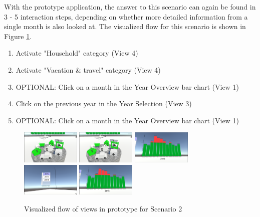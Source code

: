 With the prototype application, the answer to this scenario can again be found in 3 - 5 interaction steps, depending on whether more detailed information from a single month is also looked at. The visualized flow for this scenario is shown in Figure \ref{fig:scenariotwoprototype}.
\begin{enumerate}
	\item Activate "Household" category (View 4)
	\item Activate "Vacation \& travel" category (View 4)
	\item OPTIONAL: Click on a month in the Year Overview bar chart (View 1)
	\item Click on the previous year in the Year Selection (View 3)
	\item OPTIONAL: Click on a month in the Year Overview bar chart (View 1)
\end{enumerate}
\begin{figure}[h]
	\begin{center}
		\includegraphics[width=2.8cm]{03_Figures/08_Development/View4_CategoriesFiltering.png}
		\includegraphics[width=2.8cm]{03_Figures/08_Development/View4_CategoriesFiltering.png}
		\includegraphics[width=2.8cm]{03_Figures/08_Development/View1_YearOverview.png}
		\includegraphics[width=2.8cm]{03_Figures/08_Development/View3_YearSelection.png}
		\includegraphics[width=2.8cm]{03_Figures/08_Development/View1_YearOverview.png}
		\caption{Visualized flow of views in prototype for Scenario 2}
		\label{fig:scenariotwoprototype}
	\end{center}
\end{figure}

